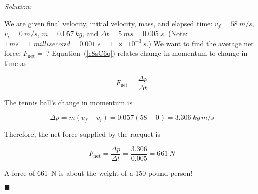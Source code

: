 \documentclass[dvipsnames]{article}
\begin{document}
\textit{Solution:} 

We are given final velocity, initial velocity, mass, and elapsed time: $v_f = \SI{58}{m/s}$, $v_i = \SI{0}{m/s}$, $m = \SI{0.057}{kg}$, and $\Delta t = \SI{5}{ms} = \SI{0.005}{s}$. (Note: $\SI{1}{ms} = \SI{1}{millisecond} = \SI{0.001}{s} = \SI{1e-3}{s}$.) We want to find the average net force: $F_{\text{net}} =\ ?$ Equation~(\ref{e8sC6q}) relates change in momentum to change in time as

\begin{equation*}
    F_{\text{net}} = \frac{\Delta p}{\Delta t}
\end{equation*}

The tennis ball's change in momentum is

\begin{equation*}
    \Delta p = m(v_f - v_i) = 0.057(58 - 0) = \SI{3.306}{kg\,m/s}
\end{equation*}

Therefore, the net force supplied by the racquet is

\begin{equation*}
    F_{\text{net}} = \frac{\Delta p}{\Delta t} = \frac{3.306}{0.005} = \SI{661}{N}
\end{equation*}
\vspace{0.1ex}

A force of \SI{661}{N} is about the weight of a 150-pound person!

\hfill $\blacksquare$
\end{document}
